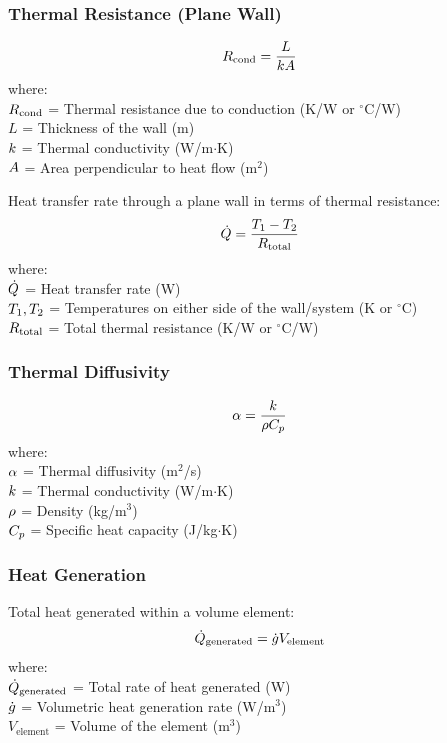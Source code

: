 \subsubsection*{Thermal Resistance (Plane Wall)}
\begin{equation}
\label{eq:thermal_resistance_formula}
    R_{\text{cond}} = \frac{L}{k A}
\end{equation}
where: \\
$R_{\text{cond}}$ = Thermal resistance due to conduction (K/W or $^\circ$C/W) \\
$L$ = Thickness of the wall (m) \\
$k$ = Thermal conductivity (W/m$\cdot$K) \\
$A$ = Area perpendicular to heat flow (m$^2$)

Heat transfer rate through a plane wall in terms of thermal resistance:
\begin{equation}
\label{eq:heat_transfer_R_formula}
    \dot{Q} = \frac{T_1 - T_2}{R_{\text{total}}}
\end{equation}
where: \\
$\dot{Q}$ = Heat transfer rate (W) \\
$T_1, T_2$ = Temperatures on either side of the wall/system (K or $^\circ$C) \\
$R_{\text{total}}$ = Total thermal resistance (K/W or $^\circ$C/W)

\subsubsection*{Thermal Diffusivity}
\begin{equation}
\label{eq:thermal_diffusivity_formula}
    \alpha = \frac{k}{\rho C_p}
\end{equation}
where: \\
$\alpha$ = Thermal diffusivity (m$^2$/s) \\
$k$ = Thermal conductivity (W/m$\cdot$K) \\
$\rho$ = Density (kg/m$^3$) \\
$C_p$ = Specific heat capacity (J/kg$\cdot$K)

\subsubsection*{Heat Generation}
Total heat generated within a volume element:
\begin{equation}
\label{eq:heat_generation_total_formula}
    \dot{Q}_{\text{generated}} = \dot{g} V_{\text{element}}
\end{equation}
where: \\
$\dot{Q}_{\text{generated}}$ = Total rate of heat generated (W) \\
$\dot{g}$ = Volumetric heat generation rate (W/m$^3$) \\
$V_{\text{element}}$ = Volume of the element (m$^3$)

